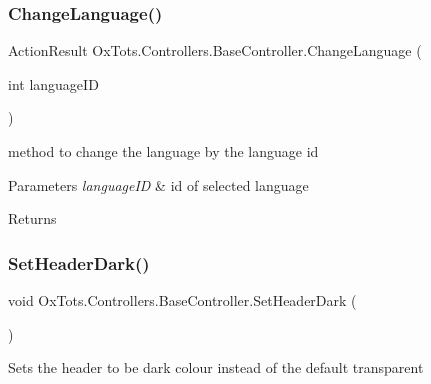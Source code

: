 \subsubsection{\texorpdfstring{ChangeLanguage()}{ChangeLanguage()}}
{\footnotesize\ttfamily Action\+Result Ox\+Tots.\+Controllers.\+Base\+Controller.\+Change\+Language (\begin{DoxyParamCaption}\item[{int}]{language\+ID }\end{DoxyParamCaption})\hspace{0.3cm}{\ttfamily [inline]}}



method to change the language by the language id 


\begin{DoxyParams}{Parameters}
{\em language\+ID} & id of selected language\\
\hline
\end{DoxyParams}
\begin{DoxyReturn}{Returns}

\end{DoxyReturn}
\mbox{\label{class_ox_tots_1_1_controllers_1_1_base_controller_ac4aff41c73d7990af15191f0d3cfc56d}} 
\subsubsection{\texorpdfstring{SetHeaderDark()}{SetHeaderDark()}}
{\footnotesize\ttfamily void Ox\+Tots.\+Controllers.\+Base\+Controller.\+Set\+Header\+Dark (\begin{DoxyParamCaption}{ }\end{DoxyParamCaption})\hspace{0.3cm}{\ttfamily [inline]}}



Sets the header to be dark colour instead of the default transparent 

\mbox{\label{class_ox_tots_1_1_controllers_1_1_base_controller_a31641ef37a646ae083784a225dc9736a}} 
